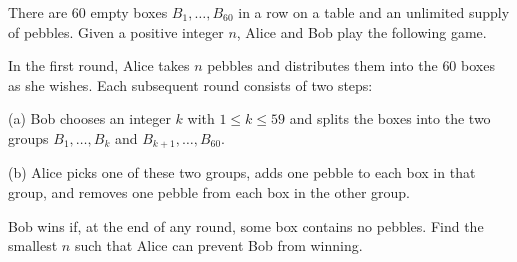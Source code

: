 There are $60$ empty boxes $B_1, \ldots, B_{60}$ in a row on a table and an unlimited supply of pebbles. Given a positive integer $n$, Alice and Bob play the following game.

In the first round, Alice takes $n$ pebbles and distributes them into the $60$ boxes as she wishes. Each subsequent round consists of two steps:

(a) Bob chooses an integer $k$ with $1 \leq k \leq 59$ and splits the boxes into the two groups $B_1, \ldots, B_k$ and $B_{k+1}, \ldots, B_{60}$.

(b) Alice picks one of these two groups, adds one pebble to each box in that group, and removes one pebble from each box in the other group.

Bob wins if, at the end of any round, some box contains no pebbles. Find the smallest $n$ such that Alice can prevent Bob from winning.
